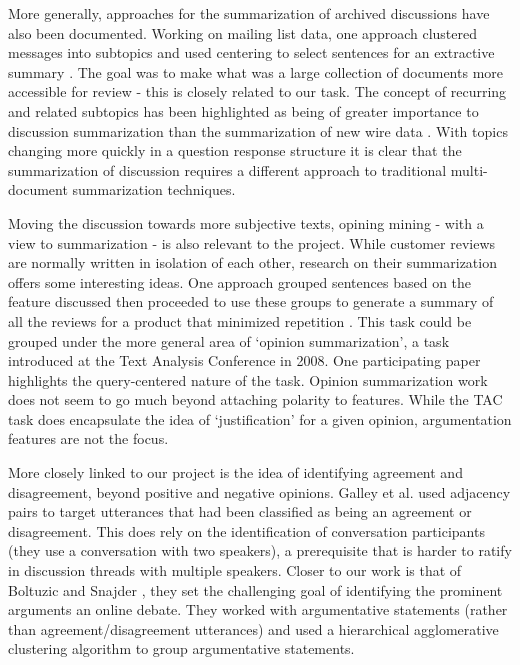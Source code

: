     More generally, approaches for the summarization of archived discussions have also been documented. Working on mailing list data, one approach clustered messages into subtopics and used centering to select sentences for an extractive summary \cite{newman2003summarizing}. The goal was to make what was a large collection of documents more accessible for review - this is closely related to our task. The concept of recurring and related subtopics has been highlighted as being of greater importance to discussion summarization than the summarization of new wire data \cite{zhou2006summarization}. With topics changing more quickly in a question response structure it is clear that the summarization of discussion requires a different approach to traditional multi-document summarization techniques.

    Moving the discussion towards more subjective texts, opining mining - with a view to summarization - is also relevant to the project. While customer reviews are normally written in isolation of each other, research on their summarization offers some interesting ideas. One approach grouped sentences based on the feature discussed then proceeded to use these groups to generate a summary of all the reviews for a product that minimized repetition \cite{hu2004mining}. This task could be grouped under the more general area of `opinion summarization', a task introduced at the Text Analysis Conference in 2008. One participating paper \cite{lloret2009towards} highlights the query-centered nature of the task. Opinion summarization work does not seem to go much beyond attaching polarity to features. While the TAC task does encapsulate the idea of `justification' for a given opinion, argumentation features are not the focus.

    More closely linked to our project is the idea of identifying agreement and disagreement, beyond positive and negative opinions. Galley et al. \cite{galley2004identifying} used adjacency pairs to target utterances that had been classified as being an agreement or disagreement. This does rely on the identification of conversation participants (they use a conversation with two speakers), a prerequisite that is harder to ratify in discussion threads with multiple speakers. Closer to our work is that of Boltuzic and Snajder \cite{boltuzic2015identifying}, they set the challenging goal of identifying the prominent arguments an online debate. They worked with argumentative statements (rather than agreement/disagreement utterances) and used a hierarchical agglomerative clustering algorithm to group argumentative statements.

